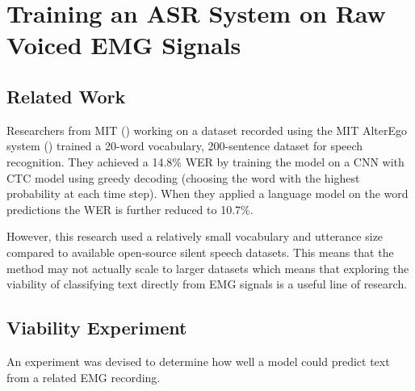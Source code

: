 \iffalse

\fi

\section{Training an ASR System on Raw Voiced EMG Signals}

\subsection{Related Work}

Researchers from MIT (\cite{alter_ego_ctc})
working on a dataset recorded using the MIT AlterEgo system
(\cite{Kapur2018HumanmachineCC}) trained
a 20-word vocabulary, 200-sentence dataset for speech recognition. They
achieved a 14.8\% WER by training the model on a CNN with CTC model using
greedy decoding (choosing the word with the highest probability at each time
step). When they applied a language model on the word predictions the WER
is further reduced to 10.7\%.

However, this research used a relatively small vocabulary and utterance 
size compared to available open-source silent speech datasets. This means
that the method may not actually scale to larger datasets which means that
exploring the viability of classifying text directly from EMG signals is
a useful line of research.

\subsection{Viability Experiment}

An experiment was devised to determine how well a model could predict
text from a related EMG recording.